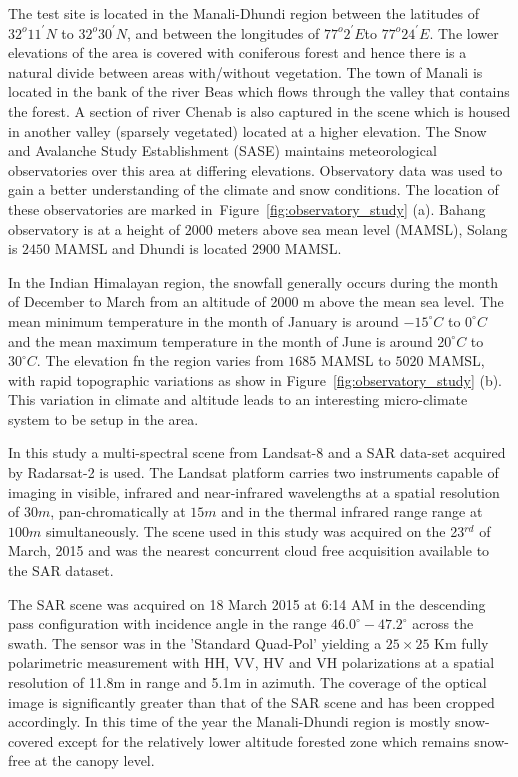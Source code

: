 The test site is located in the Manali-Dhundi region between the latitudes of $32^{o} 11^{'} N$ to $32^{o} 30^{'} N$, and between the longitudes of $77^{o} 2^{'} E$to $77^{o} 24^{'} E$. The lower elevations of the area is covered with coniferous forest and hence there is a natural divide between areas with/without vegetation. The town of Manali is located in the bank of the river Beas which flows through the valley that contains the forest. 
%
A section of river Chenab is also captured in the scene which is housed in another valley (sparsely vegetated) located at a higher elevation. The Snow and Avalanche Study Establishment (SASE) maintains meteorological observatories over this area at differing elevations. Observatory data was used to gain a better understanding of the climate and snow conditions. The location of these observatories are marked in~Figure~\ref{fig:observatory_study} (a). Bahang observatory is at a height of $2000$  meters above sea mean level (MAMSL), Solang is $2450$ MAMSL and Dhundi is located $2900$ MAMSL.


In the Indian Himalayan region, the snowfall generally occurs during the month of December to March from an altitude of 2000 m above the mean sea level. The mean minimum temperature in the month of January is around $-15^\circ C$  to $0^\circ C$ and the mean maximum temperature in the month of June is around 2$0^\circ C$ to $30^\circ C$. The elevation fn the region varies from $1685$ MAMSL to $5020$ MAMSL, with rapid topographic variations as show in Figure~\ref{fig:observatory_study} (b). This variation in climate and altitude leads to an interesting micro-climate system to be setup in the area.  

In this study a multi-spectral scene from Landsat-8 and a SAR data-set acquired by Radarsat-2 is used. 
%
The Landsat platform carries two instruments capable of imaging in visible, infrared and near-infrared wavelengths at a spatial resolution of $30m$, pan-chromatically at $15m$ and in the thermal infrared range range at $100m$ simultaneously. The scene used in this study was acquired on the 23$^{rd}$ of March, 2015 and was the nearest concurrent cloud free acquisition available to the SAR dataset. 

The SAR scene was acquired on 18 March 2015 at 6:14 AM in the descending pass configuration with incidence angle in the range $46.0^\circ-47.2^\circ$ across the swath. The sensor was in the 'Standard Quad-Pol' yielding a $25\times25$ Km fully polarimetric measurement with HH, VV, HV and VH polarizations at a spatial resolution of 11.8m in range and 5.1m in azimuth. The coverage of the optical image is significantly greater than that of the SAR scene and has been cropped accordingly. 
%
In this time of the year the Manali-Dhundi region is mostly snow-covered except for the relatively lower altitude forested zone which remains snow-free at the canopy level.












